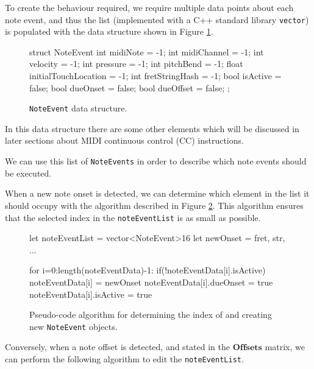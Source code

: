 To create the behaviour required, we require multiple data points about each note event, and thus the list (implemented with a C++ standard library \texttt{vector}) is populated with the data structure shown in Figure \ref{fig:noteevent}.
\begin{figure}[h]
\begin{mdframed}
    \begin{verbnobox}[\small]
struct NoteEvent
{
    	int midiNote = -1;
    	int midiChannel = -1;
    	int velocity = -1;
    	int pressure = -1;
    	int pitchBend = -1;
    	float initialTouchLocation = -1;
    	int fretStringHash = -1;
    	bool isActive = false;
    	bool dueOnset  = false;
    	bool dueOffset = false;
};
    \end{verbnobox}
    \end{mdframed}
        \caption{\texttt{NoteEvent} data structure.}
    \label{fig:noteevent}
\end{figure}

In this data structure there are some other elements which will be discussed in later sections about MIDI continuous control (CC) instructions.

We can use this list of \texttt{NoteEvents} in order to describe which note events should be executed.

When a new note onset is detected, we can determine which element in the list it should occupy with the algorithm described in Figure \ref{fig:noteon}. This algorithm ensures that the selected index in the \texttt{noteEventList} is as small as possible. 

\begin{figure}[H]
\begin{mdframed}
\begin{verbnobox}[\small]
let noteEventList = vector<NoteEvent>{16}
let newOnset = {fret, str, ...}

for i=0:length(noteEventData)-1:
{
    if(!noteEventData[i].isActive)
    {
         noteEventData[i] = newOnset
         noteEventData[i].dueOnset = true
         noteEventData[i].isActive = true
    }
}
\end{verbnobox}
\end{mdframed}
\caption{Pseudo-code algorithm for determining the index of and creating new \texttt{NoteEvent} objects.}
\label{fig:noteon}
\end{figure}

Conversely, when a note offset is detected, and stated in the $\mathbf{Offsets}$ matrix, we can perform the following algorithm to edit the \texttt{noteEventList}.


